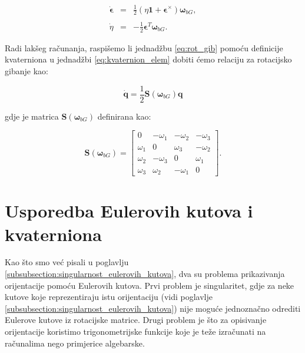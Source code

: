 \documentclass[times, utf8, diplomski, numeric]{templates/template}
\begin{document}
{{{            \begin{equation}
            \label{eq:rot_gib}
            \begin{array}{rcl}
                \dot{\boldsymbol\epsilon} &  = & \frac{1}{2}(\eta\boldsymbol{1} + \boldsymbol{\epsilon}^\times)\boldsymbol{\omega}_{bG}, \\
                & & \\
                \dot{\eta} & = & -\frac{1}{2}\boldsymbol{\epsilon}^T\boldsymbol{\omega}_{bG}.
            \end{array}
            \end{equation}

            Radi lakšeg računanja, raspišemo li jednadžbu \ref{eq:rot_gib} pomoću definicije kvaterniona u jednadžbi \ref{eq:kvaternion_elem} dobiti ćemo relaciju za rotacijsko gibanje \cite{uvod_u_svemirske} kao:

            \begin{equation}
            \label{eq:rot_qib_elem}
                \dot{\boldsymbol{q}} = \frac{1}{2} \boldsymbol{S}(\boldsymbol{\omega}_{bG}) \boldsymbol{q}
            \end{equation}

            gdje je matrica $\boldsymbol{S}(\boldsymbol{\omega}_{bG})$ definirana kao:

            \begin{equation}
                \boldsymbol{S}(\boldsymbol{\omega}_{bG}) =
                \begin{bmatrix}
                    0 & -\omega_1 & -\omega_2 & -\omega_3 \\
                    \omega_1 & 0 & \omega_3 & -\omega_2 \\
                    \omega_2 & -\omega_3 & 0 & \omega_1 \\
                    \omega_3 & \omega_2 & -\omega_1 & 0 
                \end{bmatrix}
                .
            \end{equation}
        }
    }

    \section{Usporedba Eulerovih kutova i kvaterniona}{
        Kao što smo već pisali u poglavlju \ref{subsubsection:singularnost_eulerovih_kutova}, dva su problema prikazivanja orijentacije pomoću Eulerovih kutova. Prvi problem je singularitet, gdje za neke kutove koje reprezentiraju istu orijentaciju (vidi poglavlje \ref{subsubsection:singularnost_eulerovih_kutova}) nije moguće jednoznačno odrediti Eulerove kutove iz rotacijske matrice. Drugi problem je što za opisivanje orijentacije koristimo trigonometrijske funkcije koje je teže izračunati na računalima nego primjerice algebarske.

}}
\end{document}
